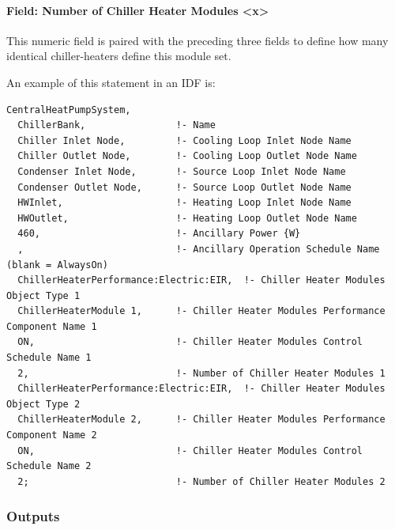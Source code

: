 \paragraph{Field: Number of Chiller Heater Modules \textless{}x\textgreater{}}\label{field-number-of-chiller-heater-modules-x}

This numeric field is paired with the preceding three fields to define how many identical chiller-heaters define this module set.

An example of this statement in an IDF is:

\begin{lstlisting}
CentralHeatPumpSystem,
  ChillerBank,                !- Name
  Chiller Inlet Node,         !- Cooling Loop Inlet Node Name
  Chiller Outlet Node,        !- Cooling Loop Outlet Node Name
  Condenser Inlet Node,       !- Source Loop Inlet Node Name
  Condenser Outlet Node,      !- Source Loop Outlet Node Name
  HWInlet,                    !- Heating Loop Inlet Node Name
  HWOutlet,                   !- Heating Loop Outlet Node Name
  460,                        !- Ancillary Power {W}
  ,                           !- Ancillary Operation Schedule Name (blank = AlwaysOn)
  ChillerHeaterPerformance:Electric:EIR,  !- Chiller Heater Modules Object Type 1
  ChillerHeaterModule 1,      !- Chiller Heater Modules Performance Component Name 1
  ON,                         !- Chiller Heater Modules Control Schedule Name 1
  2,                          !- Number of Chiller Heater Modules 1
  ChillerHeaterPerformance:Electric:EIR,  !- Chiller Heater Modules Object Type 2
  ChillerHeaterModule 2,      !- Chiller Heater Modules Performance Component Name 2
  ON,                         !- Chiller Heater Modules Control Schedule Name 2
  2;                          !- Number of Chiller Heater Modules 2
\end{lstlisting}

\subsubsection{Outputs}\label{outputs-17-000}


